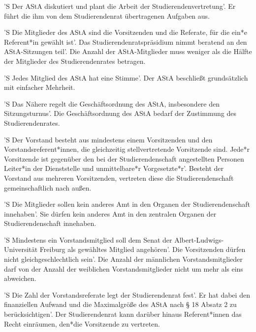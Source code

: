 \documentclass[fontsize=12pt,parskip=half]{scrartcl}
\begin{document}
\begin{contract}


  'S Der AStA diskutiert und plant die Arbeit der Studierendenvertretung'. Er führt
  die ihm von dem Studierendenrat übertragenen Aufgaben aus.

  'S Die Mitglieder des AStA sind die Vorsitzenden und die Referate, für die ein*e
  Referent*in gewählt ist'. Das Studierendenratspräsidium nimmt beratend an den
  AStA-Sitzungen teil'. Die Anzahl der AStA-Mitglieder muss weniger als die
  Hälfte der Mitglieder des Studierendenrates betragen.

  'S Jedes Mitglied des AStA hat eine Stimme'. Der AStA beschließt grundsätzlich mit
  einfacher Mehrheit.

  'S Das Nähere regelt die Geschäftsordnung des AStA, insbesondere den
  Sitzungsturnus'. Die Geschäftsordnung des AStA bedarf der Zustimmung des
  Studierendenrates.



  'S Der Vorstand besteht aus mindestens einem Vorsitzenden und den
  Vorstandsreferent*innen, die gleichzeitig stellvertretende Vorsitzende sind.
  Jede*r Vorsitzende ist gegenüber den bei der Studierendenschaft angestellten
  Personen Leiter*in der Dienststelle und unmittelbare*r Vorgesetzte*r'. Besteht
  der Vorstand aus mehreren Vorsitzenden, vertreten diese die Studierendenschaft
  gemeinschaftlich nach außen.

  'S Die Mitglieder sollen kein anderes Amt in den Organen der Studierendenschaft
  innehaben'. Sie dürfen kein anderes Amt in den zentralen Organen der
  Studierendenschaft innehaben.

  'S Mindestens ein Vorstandsmitglied soll dem Senat der Albert-Ludwigs-Universität
  Freiburg als gewähltes Mitglied angehören'. Die Vorsitzenden dürfen nicht
  gleichgeschlechtlich sein'. Die Anzahl der männlichen Vorstandsmitglieder darf
  von der Anzahl der weiblichen Vorstandsmitglieder nicht um mehr als eins
  abweichen.

  'S Die Zahl der Vorstandsreferate legt der Studierendenrat fest'. Er hat dabei den
  finanziellen Aufwand und die Maximalgröße des AStA nach § 18 Absatz 2 zu
  berücksichtigen'. Der Studierendenrat kann darüber hinaus Referent*innen das
  Recht einräumen, den*die Vorsitzende zu vertreten.




\end{contract}
\end{document}

